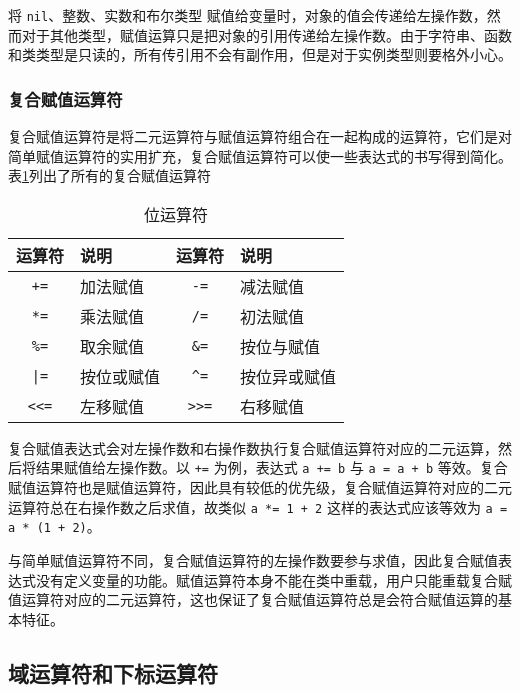 将 \texttt{nil}、整数、实数和布尔类型 赋值给变量时，对象的值会传递给左操作数，然而对于其他类型，赋值运算只是把对象的引用传递给左操作数。由于字符串、函数和类类型是只读的，所有传引用不会有副作用，但是对于实例类型则要格外小心。

\subsubsection{复合赋值运算符}

复合赋值运算符是将二元运算符与赋值运算符组合在一起构成的运算符，它们是对简单赋值运算符的实用扩充，复合赋值运算符可以使一些表达式的书写得到简化。表\ref{tab::compound_assign}列出了所有的复合赋值运算符

\begin{table}[htb]
    \centering
    \setlength{\tabcolsep}{10mm}
    \begin{tabular}{clcl} \toprule
        \textbf{运算符} & \textbf{说明} & \textbf{运算符} & \textbf{说明} \\ \midrule
        \texttt{+=} & 加法赋值 & \texttt{-=} & 减法赋值 \\
        \texttt{*=} & 乘法赋值 & \texttt{/=} & 初法赋值 \\
        \texttt{\%=} & 取余赋值 & \texttt{\&=} & 按位与赋值 \\
        \texttt{|=} & 按位或赋值 & \texttt{\textasciicircum=} & 按位异或赋值 \\
        \texttt{<<=} & 左移赋值 & \texttt{>>=} & 右移赋值 \\
        \bottomrule
    \end{tabular}
    \caption{位运算符}
    \label{tab::compound_assign}
\end{table}

复合赋值表达式会对左操作数和右操作数执行复合赋值运算符对应的二元运算，然后将结果赋值给左操作数。以 \texttt{+=} 为例，表达式 \texttt{a += b} 与 \texttt{a = a + b} 等效。复合赋值运算符也是赋值运算符，因此具有较低的优先级，复合赋值运算符对应的二元运算符总在右操作数之后求值，故类似 \texttt{a *= 1 + 2} 这样的表达式应该等效为 \texttt{a = a * (1 + 2)}。

与简单赋值运算符不同，复合赋值运算符的左操作数要参与求值，因此复合赋值表达式没有定义变量的功能。赋值运算符本身不能在类中重载，用户只能重载复合赋值运算符对应的二元运算符，这也保证了复合赋值运算符总是会符合赋值运算的基本特征。

\subsection{域运算符和下标运算符}

